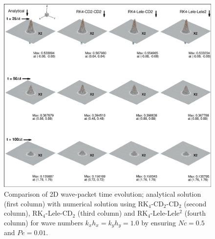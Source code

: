 \documentclass[showpacs,preprintnumbers,amsmath,amssymb]{revtex4-1} %
\begin{document}
\begin{figure}[h]
\begin{center}
\includegraphics[width=150mm]{wave_pack_all_k1.pdf}
\end{center}    
\raggedleft
\caption{Comparison of 2D wave-packet time evolution; analytical solution (first column) with numerical solution using RK$_4$-CD$_2$-CD$_2$ (second column), RK$_4$-Lele-CD$_2$ (third column) and RK$_4$-Lele-Lele$^2$ (fourth column) for wave numbers $k_xh_x=k_yh_y=1.0$ by ensuring $Nc=0.5$ and $Pe=0.01$.}
\label{fig_wave2}
\end{figure}
\end{document}
